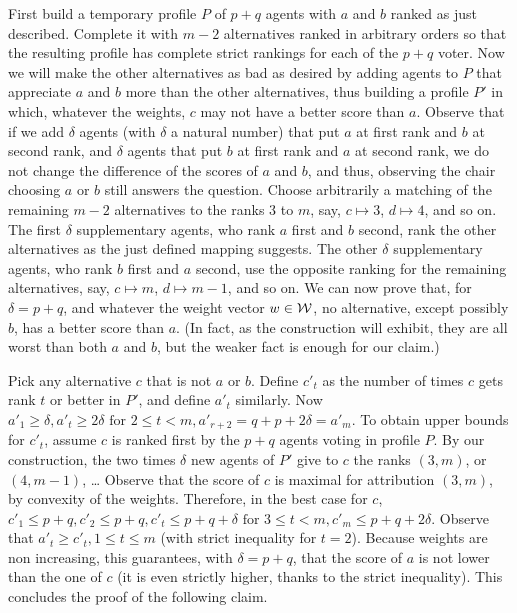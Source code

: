 First build a temporary profile $P$ of $p+q$ agents with $a$ and $b$ ranked as just described. Complete it with $m-2$ alternatives ranked in arbitrary orders so that the resulting profile has complete strict rankings for each of the $p+q$ voter. Now we will make the other alternatives as bad as desired by adding agents to $P$ that appreciate $a$ and $b$ more than the other alternatives, thus building a profile $P'$ in which, whatever the weights, $c$ may not have a better score than $a$. Observe that if we add $\delta$ agents (with $\delta$ a natural number) that put $a$ at first rank and $b$ at second rank, and $\delta$ agents that put $b$ at first rank and $a$ at second rank, we do not change the difference of the scores of $a$ and $b$, and thus, observing the chair choosing $a$ or $b$ still answers the question. Choose arbitrarily a matching of the remaining $m-2$ alternatives to the ranks $3$ to $m$, say, $c \mapsto 3$, $d \mapsto 4$, and so on. The first $\delta$ supplementary agents, who rank $a$ first and $b$ second, rank the other alternatives as the just defined mapping suggests. The other $\delta$ supplementary agents, who rank $b$ first and $a$ second, use the opposite ranking for the remaining alternatives, say, $c \mapsto m$, $d \mapsto m-1$, and so on. We can now prove that, for $\delta = p+q$, and whatever the weight vector $w \in \mathcal{W}$, no alternative, except possibly $b$, has a better score than $a$. (In fact, as the construction will exhibit, they are all worst than both $a$ and $b$, but the weaker fact is enough for our claim.)

Pick any alternative $c$ that is not $a$ or $b$. 
Define $c'_t$ as the number of times $c$ gets rank $t$ or better in $P'$, and define $a'_t$ similarly. Now $a'_1 ≥ \delta, a'_t ≥ 2\delta \text{ for } 2 ≤ t < m, a'_{r+2} = q+p+2\delta = a'_m$. To obtain upper bounds for $c'_t$, assume $c$ is ranked first by the $p+q$ agents voting in profile $P$. By our construction, the two times $\delta$ new agents of $P'$ give to $c$ the ranks $(3, m)$, or $(4, m-1)$, … Observe that the score of $c$ is maximal for attribution $(3, m)$, by convexity of the weights. Therefore, in the best case for $c$, $c'_1 ≤ p + q, c'_2 ≤ p+q, c'_t ≤ p+q+\delta \text{ for } 3 ≤ t < m, c'_m ≤ p+q+2\delta$. Observe that $a'_t ≥ c'_t, 1 ≤ t ≤ m$ (with strict inequality for $t=2$). Because weights are non increasing, this guarantees, with $\delta = p + q$, that the score of $a$ is not lower than the one of $c$ (it is even strictly higher, thanks to the strict inequality). This concludes the proof of the following claim.

